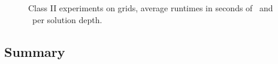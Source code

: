 \begin{figure}
    \begin{center}
%
      \\ %
\vspace{0.025\textwidth}      
		\\ %
    \end{center}
    \vspace{-0.25in} 
    \caption{%
Class II experiments on grids, average runtimes in seconds of \lexgote \ and \namoate \ per solution depth.
    }%
    \label{fig:6-15}
\end{figure}

\subsection{Summary}
\label{chapEmpiricalAnalysis:subsec:summarygridste}

